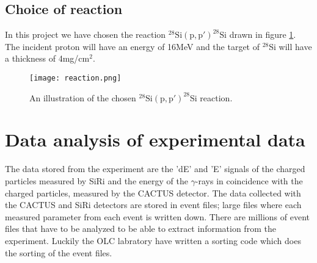\documentclass[11pt,a4wide]{article}
\begin{document}

\subsection{Choice of reaction}%
In this project we have chosen the reaction ${}^{28}\mathrm{Si(p,p')}^{28}\mathrm{Si}$ drawn in figure \ref{fig: reaction}. The incident proton will have an energy of 16MeV and the target of ${}^28$Si will have a thickness of 4mg/cm${}^2$. 

\begin{figure}[htp]
\centering
\texttt{[image: reaction.png]}
\caption{An illustration of the chosen ${}^{28}\mathrm{Si(p,p')}^{28}\mathrm{Si}$ reaction.}
\label{fig: reaction}
\end{figure}




\section{Data analysis of experimental data}
The data stored from the experiment are the 'dE' and 'E' signals of the charged particles measured by SiRi and the energy of the $\gamma$-rays in coincidence with the charged particles, measured by the CACTUS detector. The data collected with the CACTUS and SiRi detectors are stored in event files; large files where each measured parameter from each event is written down. There are millions of event files that have to be analyzed to be able to extract information from the experiment. Luckily the OLC labratory have written a sorting code which does the sorting of the event files. 
\end{document}

